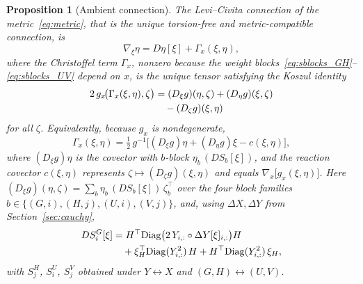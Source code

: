 \documentclass[letterpaper, 10 pt, conference]{ieeeconf}
\newcommand{\diag}{\operatorname{Diag}}
\newcommand{\Had}{\circ}
\theoremstyle{plain}
\newtheorem{proposition}{Proposition}
\theoremstyle{definition}
\theoremstyle{remark}
\begin{document}
\begin{proposition}[Ambient connection]\label{prop:conn}
The Levi--Civita connection of the metric~\eqref{eq:metric}, that is the unique torsion-free and metric-compatible connection, is
\begin{equation*}
  \nabla_\xi\eta = D\eta[\xi] + \Gamma_x(\xi,\eta),
\end{equation*}
where the Christoffel term $\Gamma_x$, nonzero because the weight blocks~\eqref{eq:sblocks_GH}--\eqref{eq:sblocks_UV} depend on $x$, is the unique tensor satisfying the Koszul identity
\begin{align}
  2\,g_x\!\big(\Gamma_x(\xi,\eta),\zeta\big) &= (D_\xi g)(\eta,\zeta) + (D_\eta g)(\xi,\zeta) \notag\\
  &\quad - (D_\zeta g)(\xi,\eta)
  \label{eq:app_koszul}
\end{align}
for all $\zeta$. Equivalently, because $g_x$ is nondegenerate,
\begin{equation}
  \Gamma_x(\xi,\eta) = \tfrac12\,g^{-1}\big[(D_\xi g)\eta + (D_\eta g)\xi - c(\xi,\eta)\big],
  \label{eq:app_gamma}
\end{equation}
where $(D_\xi g)\eta$ is the covector with $b$-block $\eta_b\,(DS_b[\xi])$, and the reaction covector $c(\xi,\eta)$ represents $\zeta\mapsto(D_\zeta g)(\xi,\eta)$ and equals $\nabla_x\big[g_x(\xi,\eta)\big]$. Here $(D_\xi g)(\eta,\zeta)=\sum_{b}\eta_b\,(DS_b[\xi])\,\zeta_b^\top$ over the four block families $b\in\{(G,i),(H,j),(U,i),(V,j)\}$, and, using $\Delta X,\Delta Y$ from Section~\ref{sec:cauchy},
\begin{align}
  DS_i^G[\xi] &= H^\top\!\diag\!\big(2\,Y_{i,:}\Had\Delta Y[\xi]_{i,:}\big)H \notag\\
  &\quad + \xi_H^\top\!\diag(Y_{i,:}^2)\,H + H^\top\!\diag(Y_{i,:}^2)\,\xi_H,
  \label{eq:app_DS}
\end{align}
with $S_j^H$, $S_i^U$, $S_j^V$ obtained under $Y\!\leftrightarrow\!X$ and $(G,H)\!\leftrightarrow\!(U,V)$.
\end{proposition}
\end{document}
